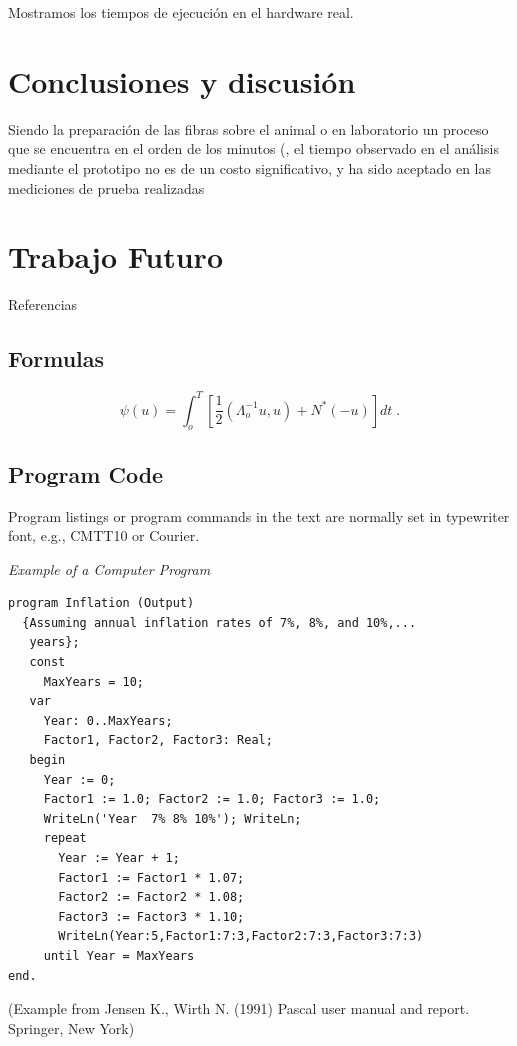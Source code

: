 \documentclass[runningheads,a4paper]{llncs}
\begin{document}
Mostramos los tiempos de ejecución en el hardware real.

\section{Conclusiones y discusión}
Siendo la preparación de las fibras sobre el animal o en laboratorio un proceso que se encuentra en el orden de los minutos (, el tiempo observado en el análisis mediante el prototipo no es de un costo significativo, y ha sido aceptado  en las mediciones de prueba realizadas 

\section{Trabajo Futuro}

Referencias



\subsection{Formulas}

\begin{equation}
  \psi (u) = \int_{o}^{T} \left[\frac{1}{2}
  \left(\Lambda_{o}^{-1} u,u\right) + N^{\ast} (-u)\right] dt \;  .
\end{equation}



\subsection{Program Code}

Program listings or program commands in the text are normally set in
typewriter font, e.g., CMTT10 or Courier.

\medskip

\noindent
{\it Example of a Computer Program}
\begin{verbatim}
program Inflation (Output)
  {Assuming annual inflation rates of 7%, 8%, and 10%,...
   years};
   const
     MaxYears = 10;
   var
     Year: 0..MaxYears;
     Factor1, Factor2, Factor3: Real;
   begin
     Year := 0;
     Factor1 := 1.0; Factor2 := 1.0; Factor3 := 1.0;
     WriteLn('Year  7% 8% 10%'); WriteLn;
     repeat
       Year := Year + 1;
       Factor1 := Factor1 * 1.07;
       Factor2 := Factor2 * 1.08;
       Factor3 := Factor3 * 1.10;
       WriteLn(Year:5,Factor1:7:3,Factor2:7:3,Factor3:7:3)
     until Year = MaxYears
end.
\end{verbatim}
%
\noindent
{\small (Example from Jensen K., Wirth N. (1991) Pascal user manual and
report. Springer, New York)}
\end{document}
